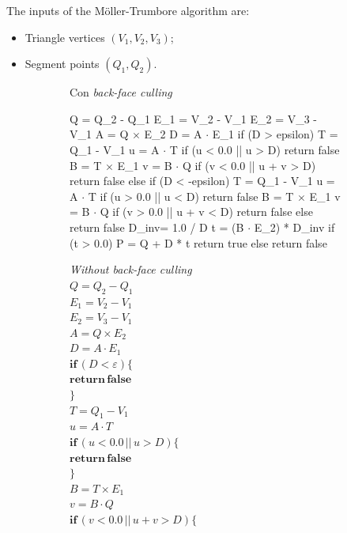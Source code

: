 The inputs of the M\"oller-Trumbore algorithm are:
\begin{itemize}
	\item Triangle vertices $(V_1, V_2, V_3)$;
	\item Segment points $(Q_1, Q_2)$.
\end{itemize}
%
\begin{figure}[htbp]
\hfill
	\begin{subfigure}[t]{.4\linewidth}
		\raggedright
		Con \textit{back-face culling}\\
		\vspace{.5em}
	\begin{pseudoc}
	Q = Q_2 - Q_1
	E_1 = V_2 - V_1
	E_2 = V_3 - V_1
	A = Q $\times$ E_2
	D = A $\cdot$ E_1
	if (D > epsilon) {
		T = Q_1 - V_1
		u = A $\cdot$ T
		if (u < 0.0 || u > D) { return false }
		B = T $\times$ E_1
		v = B $\cdot$ Q
		if (v < 0.0 || u + v > D) {return false }
	} else if (D < -epsilon) {
		T = Q_1 - V_1
		u = A $\cdot$ T
		if (u > 0.0 || u < D) { return false }
		B = T $\times$ E_1
		v = B $\cdot$ Q
		if (v > 0.0 || u + v < D) { return false }
		else { return false }
		D_inv}= 1.0 / D
		t = (B $\cdot$ E_2) * D_{inv}
		if (t > 0.0) {
			P = Q + D * t
			return true
		} else {
			return false
		}
	\end{pseudoc}
	\end{subfigure}
\hfill
	\begin{subfigure}[t]{.4\textwidth}
		\raggedright
		\textit{Without back-face culling}\\
		\vspace{.5em}
		$Q = Q_2 - Q_1$\\
		$E_1 = V_2 - V_1$\\
		$E_2 = V_3 - V_1$\\
		$A = Q \times E_2$\\
		$D = A \cdot E_1$\\
		$\mathbf{if} \, (D < \varepsilon) \{$\\
		\quad $\mathbf{return \, false}$\\
		$\}$\\
		$T = Q_1 - V_1$\\
		$u = A \cdot T$\\
		$\mathbf{if} \, (u < 0.0 \, || \, u > D) \{$\\
		\quad $\mathbf{return \, false}$\\
		$\}$\\
		$B = T \times E_1$\\
		$v = B \cdot Q$\\
		$\mathbf{if} \, (v < 0.0 \, || \, u + v > D) \{$\\

\end{subfigure}
\end{figure}
